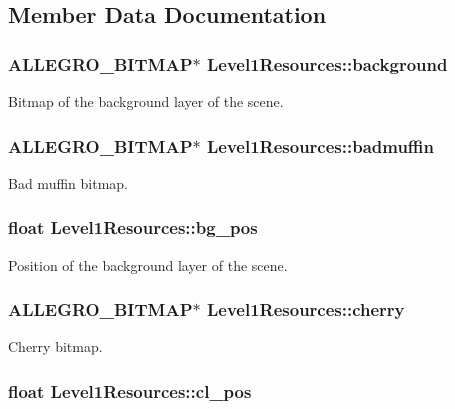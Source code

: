 \subsection{Member Data Documentation}
\hypertarget{structLevel1Resources_a45be13fc84e30d810b9baa897456fb3d}{
\subsubsection[{background}]{\setlength{\rightskip}{0pt plus 5cm}A\+L\+L\+E\+G\+R\+O\+\_\+\+B\+I\+T\+M\+A\+P$\ast$ Level1\+Resources\+::background}}\label{structLevel1Resources_a45be13fc84e30d810b9baa897456fb3d}
Bitmap of the background layer of the scene. \hypertarget{structLevel1Resources_a85e0386ee6337457d6685049821a2ff9}{
\subsubsection[{badmuffin}]{\setlength{\rightskip}{0pt plus 5cm}A\+L\+L\+E\+G\+R\+O\+\_\+\+B\+I\+T\+M\+A\+P$\ast$ Level1\+Resources\+::badmuffin}}\label{structLevel1Resources_a85e0386ee6337457d6685049821a2ff9}
Bad muffin bitmap. \hypertarget{structLevel1Resources_aaaac5418ef90dc913b0e9e771ee739d6}{
\subsubsection[{bg\+\_\+pos}]{\setlength{\rightskip}{0pt plus 5cm}float Level1\+Resources\+::bg\+\_\+pos}}\label{structLevel1Resources_aaaac5418ef90dc913b0e9e771ee739d6}
Position of the background layer of the scene. \hypertarget{structLevel1Resources_a8ab8254a85bffe77c9b6691410aef161}{
\subsubsection[{cherry}]{\setlength{\rightskip}{0pt plus 5cm}A\+L\+L\+E\+G\+R\+O\+\_\+\+B\+I\+T\+M\+A\+P$\ast$ Level1\+Resources\+::cherry}}\label{structLevel1Resources_a8ab8254a85bffe77c9b6691410aef161}
Cherry bitmap. \hypertarget{structLevel1Resources_a97c6bada8ec5c237809dfd8d9ce3fdf7}{
\subsubsection[{cl\+\_\+pos}]{\setlength{\rightskip}{0pt plus 5cm}float Level1\+Resources\+::cl\+\_\+pos}}\label{structLevel1Resources_a97c6bada8ec5c237809dfd8d9ce3fdf7}
